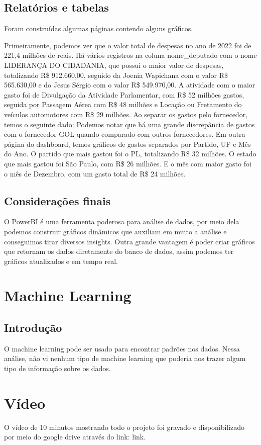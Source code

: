\documentclass[12pt, a4paper]{article}
\begin{document}
\subsection{Relatórios e tabelas}

Foram construídas algumas páginas contendo alguns gráficos.

Primeiramente, podemos ver que o valor total de despesas no ano de 2022 foi de 221,4 milhões de reais.
Há vários registros na coluna nome\_deputado com o nome LIDERANÇA DO CIDADANIA, que possui o maior valor de despesas, totalizando R\$ 912.660,00, seguido da Joenia Wapichana com o valor R\$ 565.630,00 e do Jesus Sérgio com o valor R\$ 549.970,00.
A atividade com o maior gasto foi de Divulgação da Atividade Parlamentar, com R\$ 52 milhões gastos, seguida por Passagem Aérea com R\$ 48 milhões e Locação ou Fretamento do veículos automotores com R\$ 29 milhões.
Ao separar os gastos pelo fornecedor, temos o seguinte dado:
Podemos notar que há uma grande discrepância de gastos com o fornecedor GOL quando comparado com outros fornecedores.
Em outra página do dashboard, temos gráficos de gastos separados por Partido, UF e Mês do Ano.
O partido que mais gastou foi o PL, totalizando R\$ 32 milhões.
O estado que mais gastou foi São Paulo, com R\$ 26 milhões.
E o mês com maior gasto foi o mês de Dezembro, com um gasto total de R\$ 24 milhões.
\subsection{Considerações finais}

O PowerBI é uma ferramenta poderosa para análise de dados, por meio dela podemos construir gráficos dinâmicos que auxiliam em muito a análise e conseguimos tirar diversos insights.
Outra grande vantagem é poder criar gráficos que retornam os dados diretamente do banco de dados, assim podemos ter gráficos atualizados e em tempo real.

\section{Machine Learning}
\subsection{Introdução}
O machine learning pode ser usado para encontrar padrões nos dados. Nessa análise, não vi nenhum tipo de machine learning que poderia nos trazer algum tipo de informação sobre os dados.

\section{Vídeo}
O vídeo de 10 minutos mostrando todo o projeto foi gravado e disponibilizado por meio do google drive através do link: link.
\end{document}
